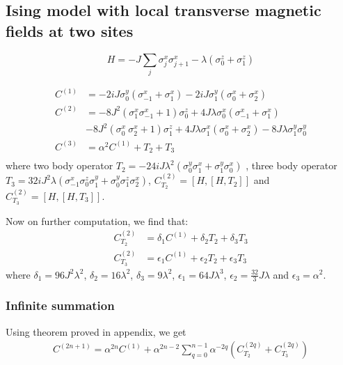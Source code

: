\documentclass[11pt,a4paper]{article}
\begin{document}
\subsection{Ising model with local transverse magnetic fields at two sites}


\begin{equation}
H= -J \sum_{j}  \sigma_j^x \sigma_{j+1}^x -  \lambda  (\sigma_0^z+ \sigma_1^z) 
\label{xx2}
\end{equation}

\begin{align*}
C^{(1)}&= -2 i J \sigma_0^y ( \sigma_{-1}^x + \sigma_1^x)  -2 i J \sigma_1^y ( \sigma_{0}^x + \sigma_2^x) \\ 
C^{(2)}&= - 8 J^2(\sigma^x_1 \sigma^x_{-1} +1) \sigma^z_0 + 4J \lambda \sigma_0^x( \sigma_{-1}^x + \sigma_1^x) \\
& - 8 J^2(\sigma^x_0 \ \sigma^x_{2}+1)  \sigma^z_1 + 4J \lambda \sigma_1^x( \sigma_{0}^x + \sigma_2^x)- 8 J \lambda \sigma_1^y \sigma_0^y\\
C^{(3)} &=   \alpha^2  C^{(1)}  +T_2  +T_3\\  %
\end{align*}
where two body operator $T_2=-24 i J \lambda^2 (\sigma^y_{0} \sigma^x_1+ \sigma^y_{1} \sigma^x_0)$  , three body operator $T_3= 32i J^2 \lambda (\sigma^x_{-1} \sigma^z_0 \sigma^y_1   + \sigma^y_{0} \sigma^z_1 \sigma^x_2)$, $C^{(2)}_{T_2}=[H, [H, T_2]]$ and  $C^{(2)}_{T_3}=[H, [H, T_3]]$.


Now on further computation, we find that:
\begin{align}
C^{(2)}_{T_2}&= \delta_1 C^{(1)} + \delta_2 T_2 + \delta_3 T_3 \\
C^{(2)}_{T_3}&= \epsilon_1 C^{(1)} + \epsilon_2 T_2 + \epsilon_3 T_3 
\end{align}
where $\delta_1= 96 J^2 \lambda^2$, $\delta_2= 16 \lambda^2$, $\delta_3= 9 \lambda^2$, $\epsilon_1= 64 J \lambda^3$, $\epsilon_2= \frac{32}{3} J \lambda$ and $\epsilon_3= \alpha^2$.



\subsubsection{Infinite summation}

Using theorem proved in appendix, we get
\begin{align*}
C^{(2n+1)}= \alpha^{2n} C^{(1)} +\alpha^{2n-2} \sum_{q=0}^{n-1} \alpha^{-2q} (C^{(2q)}_{T_2} + C^{(2q)}_{T_3}  )
\end{align*}
\end{document}
